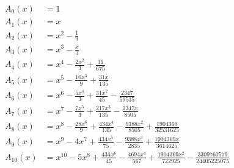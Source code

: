 \begin{align*}
A_{0}(x)&=1\\
A_{1}(x)&=x\\
A_{2}(x)&=x^{2} - \frac{1}{9}\\
A_{3}(x)&=x^{3} - \frac{x}{3}\\
A_{4}(x)&=x^{4} - \frac{2 x^{2}}{3} + \frac{31}{675}\\
A_{5}(x)&=x^{5} - \frac{10 x^{3}}{9} + \frac{31 x}{135}\\
A_{6}(x)&=x^{6} - \frac{5 x^{4}}{3} + \frac{31 x^{2}}{45} - \frac{2347}{59535}\\
A_{7}(x)&=x^{7} - \frac{7 x^{5}}{3} + \frac{217 x^{3}}{135} - \frac{2347 x}{8505}\\
A_{8}(x)&=x^{8} - \frac{28 x^{6}}{9} + \frac{434 x^{4}}{135} - \frac{9388 x^{2}}{8505} + \frac{1904369}{32531625}\\
A_{9}(x)&=x^{9} - 4 x^{7} + \frac{434 x^{5}}{75} - \frac{9388 x^{3}}{2835} + \frac{1904369 x}{3614625}\\
A_{10}(x)&=x^{10} - 5 x^{8} + \frac{434 x^{6}}{45} - \frac{4694 x^{4}}{567} + \frac{1904369 x^{2}}{722925} - \frac{3309760579}{24405225075}
\end{align*}
